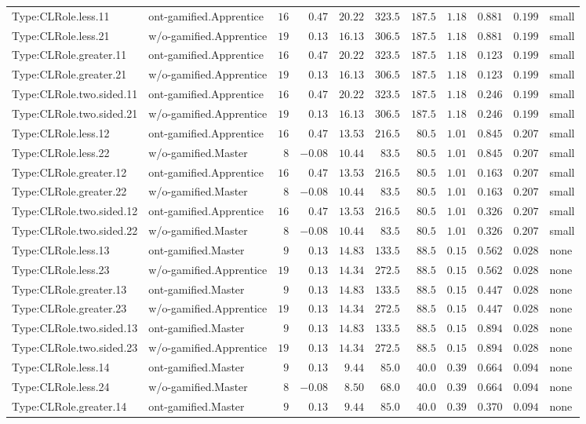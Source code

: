 \documentclass[6pt,a4paper]{article}
\begin{document}
{\begin{longtable}{llrrrrrrrrl}
Type:CLRole.less.11&ont-gamified.Apprentice&$16$&$ 0.47$&$20.22$&$323.5$&$187.5$&$1.18$&$0.881$&$0.199$&small\tabularnewline
Type:CLRole.less.21&w/o-gamified.Apprentice&$19$&$ 0.13$&$16.13$&$306.5$&$187.5$&$1.18$&$0.881$&$0.199$&small\tabularnewline
Type:CLRole.greater.11&ont-gamified.Apprentice&$16$&$ 0.47$&$20.22$&$323.5$&$187.5$&$1.18$&$0.123$&$0.199$&small\tabularnewline
Type:CLRole.greater.21&w/o-gamified.Apprentice&$19$&$ 0.13$&$16.13$&$306.5$&$187.5$&$1.18$&$0.123$&$0.199$&small\tabularnewline
Type:CLRole.two.sided.11&ont-gamified.Apprentice&$16$&$ 0.47$&$20.22$&$323.5$&$187.5$&$1.18$&$0.246$&$0.199$&small\tabularnewline
Type:CLRole.two.sided.21&w/o-gamified.Apprentice&$19$&$ 0.13$&$16.13$&$306.5$&$187.5$&$1.18$&$0.246$&$0.199$&small\tabularnewline
Type:CLRole.less.12&ont-gamified.Apprentice&$16$&$ 0.47$&$13.53$&$216.5$&$ 80.5$&$1.01$&$0.845$&$0.207$&small\tabularnewline
Type:CLRole.less.22&w/o-gamified.Master&$ 8$&$-0.08$&$10.44$&$ 83.5$&$ 80.5$&$1.01$&$0.845$&$0.207$&small\tabularnewline
Type:CLRole.greater.12&ont-gamified.Apprentice&$16$&$ 0.47$&$13.53$&$216.5$&$ 80.5$&$1.01$&$0.163$&$0.207$&small\tabularnewline
Type:CLRole.greater.22&w/o-gamified.Master&$ 8$&$-0.08$&$10.44$&$ 83.5$&$ 80.5$&$1.01$&$0.163$&$0.207$&small\tabularnewline
Type:CLRole.two.sided.12&ont-gamified.Apprentice&$16$&$ 0.47$&$13.53$&$216.5$&$ 80.5$&$1.01$&$0.326$&$0.207$&small\tabularnewline
Type:CLRole.two.sided.22&w/o-gamified.Master&$ 8$&$-0.08$&$10.44$&$ 83.5$&$ 80.5$&$1.01$&$0.326$&$0.207$&small\tabularnewline
Type:CLRole.less.13&ont-gamified.Master&$ 9$&$ 0.13$&$14.83$&$133.5$&$ 88.5$&$0.15$&$0.562$&$0.028$&none\tabularnewline
Type:CLRole.less.23&w/o-gamified.Apprentice&$19$&$ 0.13$&$14.34$&$272.5$&$ 88.5$&$0.15$&$0.562$&$0.028$&none\tabularnewline
Type:CLRole.greater.13&ont-gamified.Master&$ 9$&$ 0.13$&$14.83$&$133.5$&$ 88.5$&$0.15$&$0.447$&$0.028$&none\tabularnewline
Type:CLRole.greater.23&w/o-gamified.Apprentice&$19$&$ 0.13$&$14.34$&$272.5$&$ 88.5$&$0.15$&$0.447$&$0.028$&none\tabularnewline
Type:CLRole.two.sided.13&ont-gamified.Master&$ 9$&$ 0.13$&$14.83$&$133.5$&$ 88.5$&$0.15$&$0.894$&$0.028$&none\tabularnewline
Type:CLRole.two.sided.23&w/o-gamified.Apprentice&$19$&$ 0.13$&$14.34$&$272.5$&$ 88.5$&$0.15$&$0.894$&$0.028$&none\tabularnewline
Type:CLRole.less.14&ont-gamified.Master&$ 9$&$ 0.13$&$ 9.44$&$ 85.0$&$ 40.0$&$0.39$&$0.664$&$0.094$&none\tabularnewline
Type:CLRole.less.24&w/o-gamified.Master&$ 8$&$-0.08$&$ 8.50$&$ 68.0$&$ 40.0$&$0.39$&$0.664$&$0.094$&none\tabularnewline
Type:CLRole.greater.14&ont-gamified.Master&$ 9$&$ 0.13$&$ 9.44$&$ 85.0$&$ 40.0$&$0.39$&$0.370$&$0.094$&none\tabularnewline

\end{longtable}}
\end{document}
